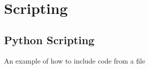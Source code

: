 \chapter{Scripting}
\label{ch:Scripting}

\section{Python Scripting}
An example of how to include code from a file

